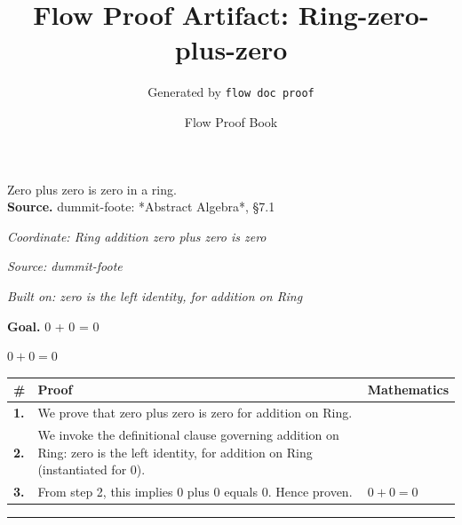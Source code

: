 \documentclass[11pt]{article}
\title{Flow Proof Artifact: Ring-zero-plus-zero}
\author{Generated by \texttt{flow doc proof}}
\date{Flow Proof Book}
\theoremstyle{definition}
\begin{document}
\maketitle
Zero plus zero is zero in a ring.\\[0.5em]
\textbf{Source.} dummit-foote: *Abstract Algebra*, §7.1\\[0.5em]
\bigskip
{}\par
\smallskip\noindent\textit{Coordinate: Ring \cdot addition \cdot zero plus zero is zero}\par
\smallskip\noindent\textit{Source: dummit-foote}\par
\smallskip\noindent\textit{Built on: zero is the left identity, for addition on Ring}\par
\medskip
\noindent\textbf{Goal.} 0 + 0 = 0\par
\noindent$\displaystyle 0 + 0 = 0$\par
\medskip
\noindent
\begin{tabular}{@{} >{\raggedright\arraybackslash}p{} >{\raggedright\arraybackslash}p{} >{\raggedleft\arraybackslash}p{} @{}}
\textbf{\#} & \textbf{Proof} & \textbf{Mathematics} \\
\midrule
\textbf{1.} & We prove that zero plus zero is zero for addition on Ring. & \\[0.45em]
\textbf{2.} & We invoke the definitional clause governing addition on Ring: zero is the left identity, for addition on Ring (instantiated for 0). & \\[0.45em]
\textbf{3.} & From step 2, this implies 0 plus 0 equals 0. Hence proven. & $\displaystyle 0 + 0 = 0$ \\[0.45em]
\bottomrule
\end{tabular}
\label{thm:Ring-addition-zero_plus_zero_is_zero}
\par\medskip\hrule
\end{document}
